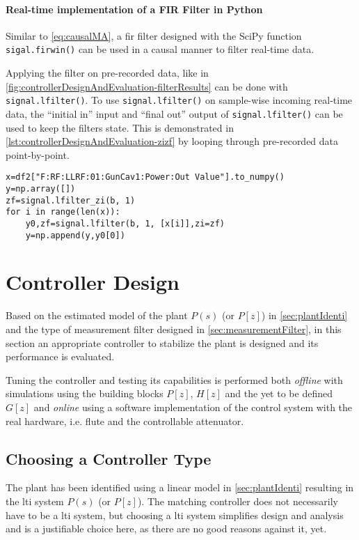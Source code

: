 \FloatBarrier
\paragraph{Real-time implementation of a FIR Filter in Python}
Similar to \autoref{eq:causalMA}, a \gls{fir} filter designed with the SciPy function \texttt{sigal.firwin()} can be used in a causal manner to filter real-time data.

Applying the filter on pre-recorded data, like in \autoref{fig:controllerDesignAndEvaluation-filterResults} can be done with \texttt{signal.lfilter()}. To use \texttt{signal.lfilter()} on sample-wise incoming real-time data, the ``initial in'' input and ``final out'' output of \texttt{signal.lfilter()} can be used to keep the filters state. This is demonstrated in \autoref{lst:controllerDesignAndEvaluation-zizf} by looping through pre-recorded data point-by-point.

\begin{lstlisting}[style=python,caption = Demonstration of the \texttt{zi} and \texttt{zf} variables when using \texttt{signal.lfilter()}, label = lst:controllerDesignAndEvaluation-zizf]
x=df2["F:RF:LLRF:01:GunCav1:Power:Out Value"].to_numpy()
y=np.array([])
zf=signal.lfilter_zi(b, 1)
for i in range(len(x)):
    y0,zf=signal.lfilter(b, 1, [x[i]],zi=zf)
    y=np.append(y,y0[0])
\end{lstlisting}











\newpage
\section{Controller Design}
Based on the estimated model of the plant $P(s)$ (or $P[z]$) in \autoref{sec:plantIdenti} and the type of measurement filter designed in \autoref{sec:measurementFilter}, in this section an appropriate controller to stabilize the plant is designed and its performance is evaluated.

Tuning the controller and testing its capabilities is performed both \textit{offline} with simulations using the building blocks $P[z]$, $H[z]$ and the yet to be defined $G[z]$ and \textit{online} using a software implementation of the control system with the real hardware, i.e. \gls{flute} and the controllable attenuator.

\subsection{Choosing a Controller Type}
The plant has been identified using a linear model in \autoref{sec:plantIdenti} resulting in the \gls{lti} system $P(s)$ (or $P[z]$). The matching controller does not necessarily have to be a \gls{lti} system, but choosing a \gls{lti} system simplifies design and analysis and is a justifiable choice here, as there are no good reasons against it, yet.

